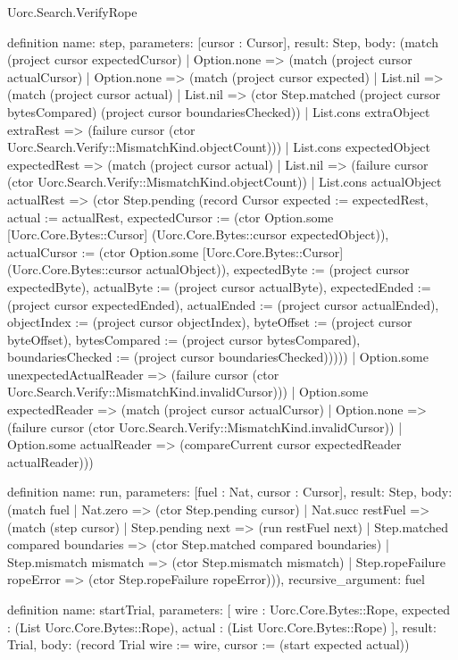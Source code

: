 \begin{lexlean}{Uorc.Search.VerifyRope}
\begin{semanticmodule}
definition{
  name: step,
  parameters: [cursor : Cursor],
  result: Step,
  body: (match (project cursor expectedCursor)
    | Option.none => (match (project cursor actualCursor)
      | Option.none => (match (project cursor expected)
        | List.nil => (match (project cursor actual)
          | List.nil => (ctor Step.matched (project cursor bytesCompared) (project cursor boundariesChecked))
          | List.cons extraObject extraRest => (failure cursor (ctor Uorc.Search.Verify::MismatchKind.objectCount)))
        | List.cons expectedObject expectedRest => (match (project cursor actual)
          | List.nil => (failure cursor (ctor Uorc.Search.Verify::MismatchKind.objectCount))
          | List.cons actualObject actualRest => (ctor Step.pending (record Cursor {expected := expectedRest, actual := actualRest, expectedCursor := (ctor Option.some [Uorc.Core.Bytes::Cursor] (Uorc.Core.Bytes::cursor expectedObject)), actualCursor := (ctor Option.some [Uorc.Core.Bytes::Cursor] (Uorc.Core.Bytes::cursor actualObject)), expectedByte := (project cursor expectedByte), actualByte := (project cursor actualByte), expectedEnded := (project cursor expectedEnded), actualEnded := (project cursor actualEnded), objectIndex := (project cursor objectIndex), byteOffset := (project cursor byteOffset), bytesCompared := (project cursor bytesCompared), boundariesChecked := (project cursor boundariesChecked)}))))
      | Option.some unexpectedActualReader => (failure cursor (ctor Uorc.Search.Verify::MismatchKind.invalidCursor)))
    | Option.some expectedReader => (match (project cursor actualCursor)
      | Option.none => (failure cursor (ctor Uorc.Search.Verify::MismatchKind.invalidCursor))
      | Option.some actualReader => (compareCurrent cursor expectedReader actualReader)))
}

definition{
  name: run,
  parameters: [fuel : Nat, cursor : Cursor],
  result: Step,
  body: (match fuel
    | Nat.zero => (ctor Step.pending cursor)
    | Nat.succ restFuel => (match (step cursor)
      | Step.pending next => (run restFuel next)
      | Step.matched compared boundaries => (ctor Step.matched compared boundaries)
      | Step.mismatch mismatch => (ctor Step.mismatch mismatch)
      | Step.ropeFailure ropeError => (ctor Step.ropeFailure ropeError))),
  recursive_argument: fuel
}

definition{
  name: startTrial,
  parameters: [
    wire : Uorc.Core.Bytes::Rope,
    expected : (List Uorc.Core.Bytes::Rope),
    actual : (List Uorc.Core.Bytes::Rope)
  ],
  result: Trial,
  body: (record Trial {wire := wire, cursor := (start expected actual)})
}


\end{semanticmodule}
\end{lexlean}
